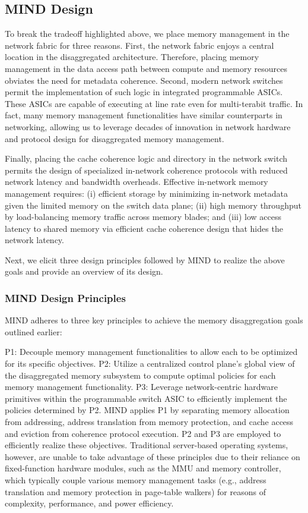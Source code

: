 \subsection{MIND Design}
To break the tradeoff highlighted above, we place memory management in the network fabric for three reasons. First, the network fabric enjoys a central location in the disaggregated architecture. Therefore, placing memory management in the data access path between compute and memory resources obviates the need for metadata coherence. Second, modern network switches permit the implementation of such logic in integrated programmable ASICs. These ASICs are capable of executing at line rate even for multi-terabit traffic. In fact, many memory management functionalities have similar counterparts in networking, allowing us to leverage decades of innovation in network hardware and protocol design for disaggregated memory management.

Finally, placing the cache coherence logic and directory in the network switch permits the design of specialized in-network coherence protocols with reduced network latency and bandwidth overheads. Effective in-network memory management requires: (i) efficient storage by minimizing in-network metadata given the limited memory on the switch data plane; (ii) high memory throughput by load-balancing memory traffic across memory blades; and (iii) low access latency to shared memory via efficient cache coherence design that hides the network latency.

Next, we elicit three design principles followed by MIND to realize the above goals and provide an overview of its design.

\subsubsection{MIND Design Principles}
MIND adheres to three key principles to achieve the memory disaggregation goals outlined earlier:

P1: Decouple memory management functionalities to allow each to be optimized for its specific objectives.
P2: Utilize a centralized control plane's global view of the disaggregated memory subsystem to compute optimal policies for each memory management functionality.
P3: Leverage network-centric hardware primitives within the programmable switch ASIC to efficiently implement the policies determined by P2.
MIND applies P1 by separating memory allocation from addressing, address translation from memory protection, and cache access and eviction from coherence protocol execution. P2 and P3 are employed to efficiently realize these objectives. Traditional server-based operating systems, however, are unable to take advantage of these principles due to their reliance on fixed-function hardware modules, such as the MMU and memory controller, which typically couple various memory management tasks (e.g., address translation and memory protection in page-table walkers) for reasons of complexity, performance, and power efficiency.

